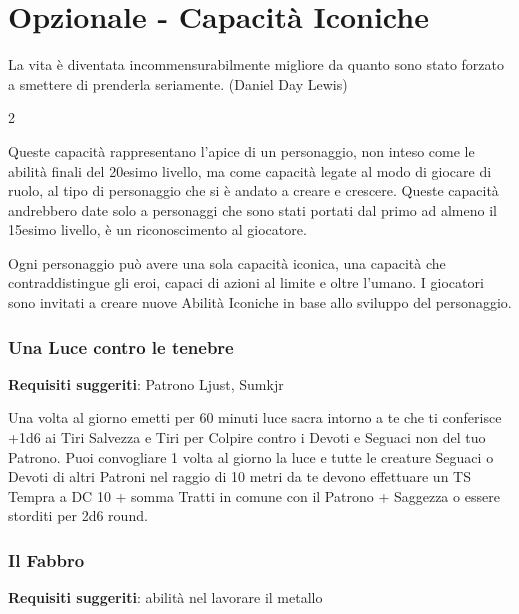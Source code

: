 \section{Opzionale - Capacità Iconiche}\hypertarget{abilitaiconiche}{}\label{abilitaiconiche}

\begin{enfasi}{
La vita è diventata incommensurabilmente migliore da quanto sono stato forzato a smettere di prenderla seriamente. (Daniel Day Lewis)
}\end{enfasi}

\begin{multicols}{2}


Queste capacità rappresentano l'apice di un personaggio, non inteso come le abilità finali del 20esimo livello, ma come capacità legate al modo di giocare di ruolo, al tipo di personaggio che si è andato a creare e crescere. Queste capacità andrebbero date solo a personaggi che sono stati portati dal primo ad almeno il 15esimo livello, è un riconoscimento al giocatore.

Ogni personaggio può avere una sola capacità iconica, una capacità che contraddistingue gli eroi, capaci di azioni al limite e oltre l'umano. I giocatori sono invitati a creare nuove Abilità Iconiche in base allo sviluppo del personaggio.

\medskip

\subsubsection{Una Luce contro le tenebre}

\textbf{Requisiti suggeriti}: Patrono Ljust, Sumkjr

Una volta al giorno emetti per 60 minuti luce sacra intorno a te che ti conferisce +1d6 ai Tiri Salvezza e Tiri per Colpire contro i Devoti e Seguaci non del tuo Patrono. Puoi convogliare 1 volta al giorno la luce e tutte le creature Seguaci o Devoti di altri Patroni nel raggio di 10 metri da te devono effettuare un TS Tempra a DC 10 + somma Tratti in comune con il Patrono + Saggezza o essere storditi per 2d6 round.

\subsubsection{Il Fabbro}

\textbf{Requisiti suggeriti}: abilità nel lavorare il metallo


\end{multicols}
